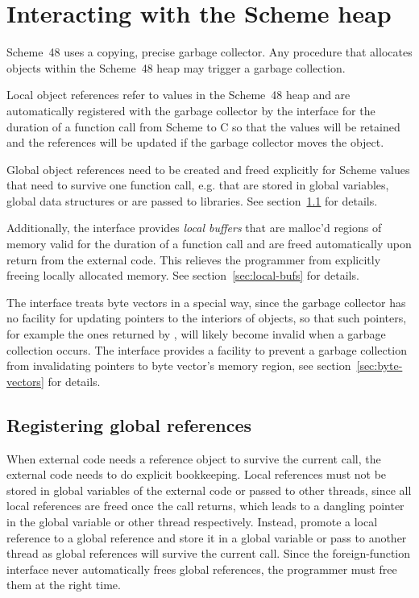 \section{Interacting with the Scheme heap}
\label{sec:heap-allocation}
\label{gc}

Scheme~48 uses a copying, precise garbage collector.
Any procedure that allocates objects within the Scheme~48 heap may trigger
 a garbage collection.

Local object references refer to values in the Scheme~48 heap and are
 automatically registered with the garbage collector by the interface
 for the duration of a function call from Scheme to C so that the
 values will be retained and the references will be updated if the
 garbage collector moves the object.

Global object references need to be created and freed explicitly for
 Scheme values that need to survive one function call, e.g. that are
 stored in global variables, global data structures or are passed to
 libraries.  See section~\ref{sec:global-references} for details.

Additionally, the interface provides \emph{local buffers} that are malloc'd regions
 of memory valid for the duration of a function call and are freed automatically upon
 return from the external code.  This relieves the programmer from explicitly freeing
 locally allocated memory.  See section~\ref{sec:local-bufs} for details.

The interface treats byte vectors in a special way, since the garbage
 collector has no facility for updating pointers to the interiors of
 objects, so that such pointers, for example the ones returned by
 , will likely become
 invalid when a garbage collection occurs.  The interface provides a
 facility to prevent a garbage collection from invalidating pointers to
 byte vector's memory region, see section~\ref{sec:byte-vectors} for 
 details.

\subsection{Registering global references}
\label{sec:global-references}

When external code needs a reference object to survive the current
call, the external code needs to do explicit bookkeeping.  Local
references must not be stored in global variables of the external code
or passed to other threads, since all local references are freed once
the call returns, which leads to a dangling pointer in the global
variable or other thread respectively.  Instead, promote a local
reference to a global reference and store it in a global variable or
pass to another thread as global references will survive the current
call.  Since the foreign-function interface never automatically frees
global references, the programmer must free them at the right time.

